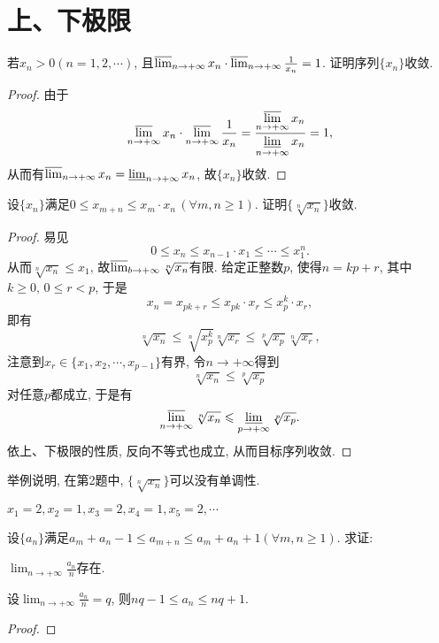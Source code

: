 \section{上、下极限}
\begin{quiza}
\woe 若\(x_n>0(n=1,2,\cdots)\), 且\(\varlimsup_{n\rightarrow+\infty}x_n\cdot\varlimsup_{n\rightarrow+\infty}\frac{1}{x_n}=1\). 证明序列\(\{x_n\}\)收敛.
\begin{proof}
由于\[\varlimsup_{n\rightarrow+\infty}x_n\cdot\varlimsup_{n\rightarrow+\infty}\frac{1}{x_n}=\frac{\displaystyle\varlimsup_{n\rightarrow+\infty}x_n}{\displaystyle\varliminf_{n\rightarrow+\infty}x_n}=1,\]从而有\(\varlimsup_{n\rightarrow+\infty}x_n=\varliminf_{n\rightarrow+\infty}x_n\), 故\(\{x_n\}\)收敛.
\end{proof}
\woe 设\(\{x_n\}\)满足\(0\leqslant x_{m+n}\leqslant x_{m}\cdot x_{n}\,(\forall m,n\geqslant 1)\). 证明\(\{\sqrt[n]{x_n}\}\)收敛.
\begin{proof}
易见\[0\leqslant x_n\leqslant x_{n-1}\cdot x_1\leqslant \cdots\leqslant x_1^n.\]从而\(\sqrt[n]{x_n}\leqslant x_1\), 故\(\varlimsup_{b\rightarrow+\infty}\sqrt[n]{x_n}\)有限. 给定正整数\(p\), 使得\(n=kp+r\), 其中\(k\geqslant 0,\, 0\leqslant r<p\), 于是\[x_n=x_{pk+r}\leqslant x_{pk}\cdot x_r\leqslant x_p^k\cdot x_r,\]即有\[\sqrt[n]{x_n}\leqslant \sqrt[n]{x_p^k}\sqrt[n]{x_r}\leqslant \sqrt[p]{x_p}\sqrt[n]{x_r},\]注意到\(x_r\in\{x_1,x_2,\cdots,x_{p-1}\}\)有界, 令\(n\rightarrow+\infty\)得到\[\sqrt[n]{x_n}\leqslant\sqrt[p]{x_p}\]对任意\(p\)都成立, 于是有\[\varlimsup_{n\rightarrow+\infty}\sqrt[n]{x_n}\leqslant\varliminf_{p\rightarrow+\infty}\sqrt[p]{x_p}.\]依上、下极限的性质, 反向不等式也成立, 从而目标序列收敛.
\end{proof}
\woe 举例说明, 在第2题中, \(\{\sqrt[n]{x_n}\}\)可以没有单调性.
\begin{solution}
\(x_1=2,x_2=1,x_3=2,x_4=1,x_5=2,\cdots\)
\end{solution}
\woe 设\(\{a_n\}\)满足\(a_m+a_n-1\leqslant a_{m+n}\leqslant a_m+a_n+1(\forall m,n\geqslant 1)\). 求证: 
\begin{quizs}
\item \(\lim_{n\rightarrow+\infty}\frac{a_n}{n}\)存在.
\item 设\(\lim_{n\rightarrow+\infty}\frac{a_n}{n}=q\), 则\(nq-1\leqslant a_n\leqslant nq+1\).
\end{quizs}
\begin{proof}


\end{proof}
\end{quiza}
